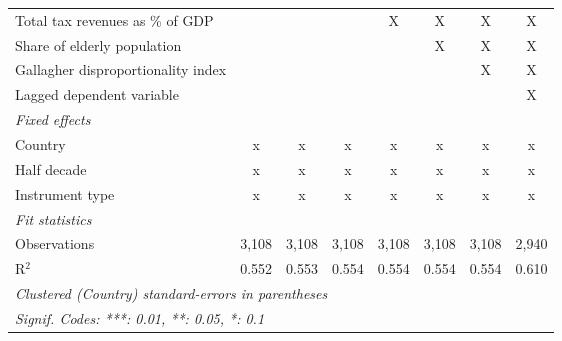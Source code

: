 \begin{table}[htbp]
\begin{tabular}{lccccccc}
      Total tax revenues as \% of GDP                                        &               &               &               & X             & X             & X             & X\\  
      Share of elderly population                                            &               &               &               &               & X             & X             & X\\  
      Gallagher disproportionality index                                     &               &               &               &               &               & X             & X\\  
      Lagged dependent variable                                              &               &               &               &               &               &               & X\\  
      \emph{Fixed effects}\\
      Country                                                                & x             & x             & x             & x             & x             & x             & x\\  
      Half decade                                                            & x             & x             & x             & x             & x             & x             & x\\  
      Instrument type                                                        & x             & x             & x             & x             & x             & x             & x\\  
      \midrule \emph{Fit statistics}\\
      Observations                                                           & 3,108         & 3,108         & 3,108         & 3,108         & 3,108         & 3,108         & 2,940\\  
      R$^2$                                                                  & 0.552         & 0.553         & 0.554         & 0.554         & 0.554         & 0.554         & 0.610\\  
      \midrule
      \multicolumn{8}{l}{\emph{Clustered (Country) standard-errors in parentheses}}\\
      \multicolumn{8}{l}{\emph{Signif. Codes: ***: 0.01, **: 0.05, *: 0.1}}\\
   \end{tabular}
\end{table}


